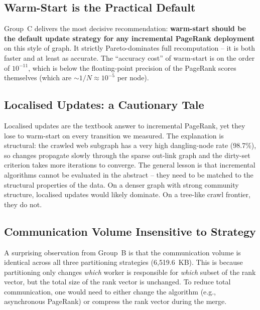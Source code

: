 \documentclass[11pt,a4paper]{article}
\begin{document}
\subsection{Warm-Start is the Practical Default}
\label{sec:disc-warm}

Group~C delivers the most decisive recommendation: \textbf{warm-start
should be the default update strategy for any incremental PageRank
deployment} on this style of graph. It strictly Pareto-dominates full
recomputation -- it is both faster and at least as accurate. The
``accuracy cost'' of warm-start is on the order of $10^{-11}$, which
is below the floating-point precision of the PageRank scores
themselves (which are $\sim 1/N \approx 10^{-5}$ per node).

\subsection{Localised Updates: a Cautionary Tale}
\label{sec:disc-localised}

Localised updates are the textbook answer to incremental PageRank, yet
they lose to warm-start on every transition we measured. The
explanation is structural: the crawled web subgraph has a very high
dangling-node rate (98.7\%), so changes propagate slowly through the
sparse out-link graph and the dirty-set criterion takes more
iterations to converge. The general lesson is that incremental
algorithms cannot be evaluated in the abstract -- they need to be
matched to the structural properties of the data. On a denser graph
with strong community structure, localised updates would likely
dominate. On a tree-like crawl frontier, they do not.

\subsection{Communication Volume Insensitive to Strategy}
A surprising observation from Group~B is that the communication volume
is identical across all three partitioning strategies (6{,}519.6~KB).
This is because partitioning only changes \emph{which} worker is
responsible for \emph{which} subset of the rank vector, but the total
size of the rank vector is unchanged. To reduce total communication,
one would need to either change the algorithm (e.g., asynchronous
PageRank) or compress the rank vector during the merge.
\end{document}
